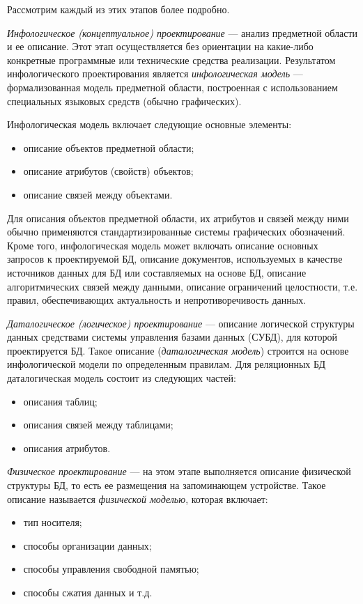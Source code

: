Рассмотрим каждый из этих этапов более подробно.

\textit{Инфологическое (концептуальное) проектирование} --- анализ
предметной области и ее описание. Этот этап осуществляется без ориентации
на какие-либо конкретные программные или технические средства реализации.
Результатом инфологического проектирования является \textit{инфологическая модель} ---
формализованная модель предметной области, построенная с использованием
специальных языковых средств (обычно графических).

Инфологическая модель включает следующие основные элементы:
\begin{itemize}
\item
  описание объектов предметной области;
\item
  описание атрибутов (свойств) объектов;
\item
  описание связей между объектами.
\end{itemize}

Для описания объектов предметной области, их атрибутов и связей между
ними обычно применяются стандартизированные системы графических обозначений.
Кроме того, инфологическая модель может включать
описание основных запросов к проектируемой БД,
описание документов, используемых в качестве
источников данных для БД или составляемых на основе БД,
описание алгоритмических связей между данными,
описание ограничений целостности, т.е. правил, обеспечивающих
актуальность и непротиворечивость данных.

\textit{Даталогическое (логическое) проектирование} --- описание
логической структуры данных средствами системы управления базами данных
(СУБД), для которой проектируется БД.
Такое описание (\textit{даталогическая модель}) строится на основе инфологической модели
по определенным правилам.
Для реляционных БД даталогическая модель состоит из следующих частей:
\begin{itemize}
\item
  описания таблиц;
\item
  описания связей между таблицами;
\item
  описания атрибутов.
\end{itemize}

\textit{Физическое проектирование} --- на этом этапе выполняется описание физической
структуры БД, то есть ее размещения на запоминающем устройстве.
Такое описание называется \textit{физической моделью}, которая включает:

\begin{itemize}
\item
  тип носителя;
\item
  способы организации данных;
\item
  способы управления свободной памятью;
\item
  способы сжатия данных и т.д.
\end{itemize}

